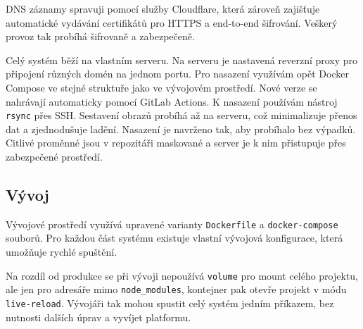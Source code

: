 DNS záznamy spravuji pomocí služby Cloudflare, která zároveň zajišťuje automatické vydávání certifikátů pro HTTPS a end-to-end šifrování. 
Veškerý provoz tak probíhá šifrovaně a zabezpečeně.

Celý systém běží na vlastním serveru. 
Na serveru je nastavená reverzní proxy pro připojení různých domén na jednom portu.
Pro nasazení využívám opět Docker Compose ve stejné struktuře jako ve vývojovém prostředí.
Nové verze se nahrávají automaticky pomocí GitLab Actions. 
K nasazení používám nástroj \texttt{rsync} přes SSH. 
Sestavení obrazů probíhá až na serveru, což minimalizuje přenos dat a zjednodušuje ladění. 
Nasazení je navrženo tak, aby probíhalo bez výpadků. 
Citlivé proměnné jsou v repozitáři maskované a server je k nim přistupuje přes zabezpečené prostředí.

\subsection{Vývoj}

Vývojové prostředí využívá upravené varianty \texttt{Dockerfile} a \texttt{docker-compose} souborů. Pro každou část systému existuje vlastní vývojová konfigurace, která umožňuje rychlé spuštění.

Na rozdíl od produkce se při vývoji nepoužívá \texttt{volume} pro mount celého projektu, ale jen pro adresáře mimo \texttt{node\_modules}, kontejner pak otevře projekt v módu \texttt{live-reload}.
Vývojáři tak mohou spustit celý systém jedním příkazem, bez nutnosti dalších úprav a vyvíjet platformu.






